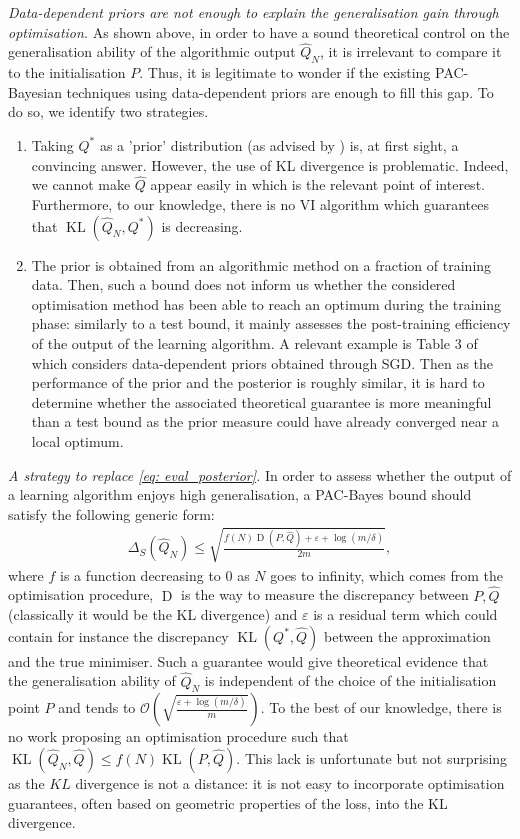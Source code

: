 \textit{Data-dependent priors are not enough to explain the generalisation gain through optimisation.}
As shown above, in order to have a sound theoretical control on the generalisation ability of the algorithmic output $\hat{Q}_N$, it is irrelevant to compare it to the initialisation $P$. Thus, it is legitimate to wonder if the existing PAC-Bayesian techniques using data-dependent priors are enough to fill this gap. To do so, we identify two strategies.
\begin{enumerate}
  \item Taking $Q^*$ as a 'prior' distribution (as advised by \citealp{dziugaite2017computing}) is, at first sight, a convincing answer. However, the use of KL divergence is problematic. Indeed, we cannot make $\hat{Q}$ appear easily in  which is the relevant point of interest. Furthermore, to our knowledge, there is no VI algorithm which guarantees that $\operatorname{KL}(\hat{Q}_N,Q^*)$ is decreasing.
  \item The prior is obtained from an algorithmic method on a fraction of training data. Then, such a bound does not inform us whether the considered optimisation method has been able to reach an optimum during the training phase: similarly to a test bound, it mainly assesses the post-training efficiency of the output of the learning algorithm. A relevant example is Table 3 of \citet{perezortiz2021learning} which considers data-dependent priors obtained through SGD. Then as the performance of the prior and the posterior is roughly similar, it is hard to determine whether the associated theoretical guarantee is more meaningful than a test bound as the prior measure could have already converged near a local optimum.
\end{enumerate}

\textit{A strategy to replace \eqref{eq: eval_posterior}.}
In order to assess whether the output of a learning algorithm enjoys high generalisation, a PAC-Bayes bound should satisfy the following generic form:
\begin{align}
\label{eq: wanted_pattern}
\Delta_S(\hat{Q}_N) \leq \sqrt{\frac{f(N)\operatorname{D}(P,\hat{Q}) + \varepsilon+ \log(m/\delta)}{2m}},
\end{align}
where $f$ is a function decreasing to $0$ as $N$ goes to infinity, which comes from the optimisation procedure, $\operatorname{D}$ is the way to measure the discrepancy between $P,\hat{Q}$ (classically it would be the KL divergence) and $\varepsilon$ is a residual term which could contain for instance the discrepancy $\operatorname{KL}(Q^*,\hat{Q})$ between the approximation and the true minimiser.
Such a guarantee would give theoretical evidence that the generalisation ability of $\hat{Q}_N$ is independent of the choice of the initialisation point $P$ and tends to $\mathcal{O}\left( \sqrt{\frac{\varepsilon + \log(m/\delta)}{m}} \right)$.
To the best of our knowledge, there is no work proposing an optimisation procedure such that $\operatorname{KL}(\hat{Q}_N,\hat{Q}) \leq f(N)  \operatorname{KL}(P,\hat{Q})$.  This lack is unfortunate but not surprising as the $KL$ divergence is not a distance: it is not easy to incorporate optimisation guarantees, often based on geometric properties of the loss, into the KL divergence.


